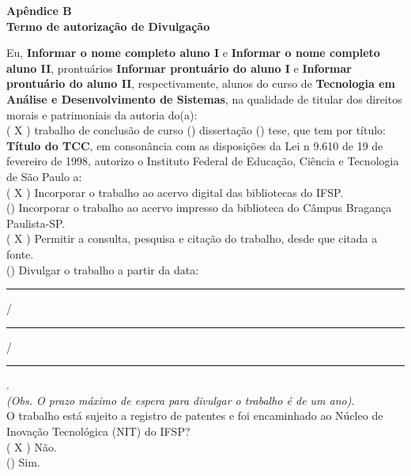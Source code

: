 \documentclass[12pt,a4paper]{report}
\newcommand{\curso}{Tecnologia em Análise e Desenvolvimento de Sistemas}
\newcommand{\cabecalho}{Apêndice B \\ Termo de autorização de Divulgação}
\newcommand{\tema}{Título do TCC}
\newcommand{\alunoA}{Informar o nome completo aluno I}
\newcommand{\prontuarioA}{Informar prontuário do aluno I}
\newcommand{\alunoB}{Informar o nome completo aluno II}
\newcommand{\prontuarioB}{Informar prontuário do aluno II}
\begin{document}
	\begin{center}
		{\small\textbf{\cabecalho}}\\
		\vspace{0.5cm}
	\end{center}
	
	\noindent Eu, \textbf{\alunoA} e \textbf{\alunoB}, prontuários \textbf{\prontuarioA} e \textbf{\prontuarioB}, respectivamente, alunos do curso de \textbf{\curso}, na qualidade de titular dos direitos morais e patrimoniais da autoria do(a): \vspace{6pt}\\
	( X ) trabalho de conclusão de curso \hspace{0.5cm}   (\hspace{0.5cm}) \hspace{0.5cm} dissertação (\hspace{0.5cm}) tese, que tem por título: \textbf{\tema}, em consonância com as disposições da Lei n\textdegree \hspace{0.01cm} 9.610 de 19 de fevereiro de 1998, autorizo o Instituto Federal de Educação, Ciência e Tecnologia de São Paulo a: \vspace{6pt}\\
	( X ) Incorporar o trabalho ao acervo digital das bibliotecas do IFSP. \vspace{4pt}\\
    (\hspace{0.5cm}) Incorporar o trabalho ao acervo impresso da biblioteca do Câmpus Bragança Paulista-SP.\vspace{4pt} \\
    ( X ) Permitir a consulta, pesquisa e citação do trabalho, desde que citada a fonte.\vspace{4pt} \\
    (\hspace{0.5cm}) Divulgar o trabalho a partir da data:  \hspace{0.01cm}\rule{1cm}{0.1pt} \hspace{0.01cm} / \rule{1cm}{0.1pt}\hspace{0.01cm} / \hspace{0.01cm}\rule{1cm}{0.1pt}.\\
    \textit{\footnotesize{(Obs. O prazo máximo de espera para divulgar o trabalho é de um ano)}}.  \\
    

    \noindent O trabalho está sujeito a registro de patentes e foi encaminhado ao Núcleo de Inovação Tecnológica (NIT) do IFSP?\vspace{6pt} \\
    ( X ) Não.\vspace{6pt} \\
    (\hspace{0.5cm}) Sim. \vspace{6pt}\\
\end{document}
